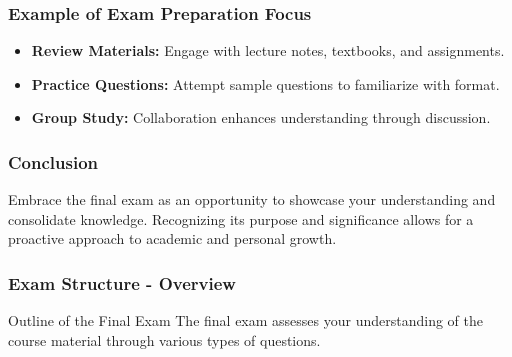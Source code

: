 \documentclass{beamer}
\begin{document}
\begin{frame}[fragile]
    \frametitle{Example of Exam Preparation Focus}
    \begin{itemize}
        \item \textbf{Review Materials:} Engage with lecture notes, textbooks, and assignments.
        \item \textbf{Practice Questions:} Attempt sample questions to familiarize with format.
        \item \textbf{Group Study:} Collaboration enhances understanding through discussion.
    \end{itemize}
\end{frame}

\begin{frame}[fragile]
    \frametitle{Conclusion}
    Embrace the final exam as an opportunity to showcase your understanding and consolidate knowledge. Recognizing its purpose and significance allows for a proactive approach to academic and personal growth.
\end{frame}

\begin{frame}[fragile]
    \frametitle{Exam Structure - Overview}
    \begin{block}{Outline of the Final Exam}
        The final exam assesses your understanding of the course material through various types of questions.
    \end{block}
\end{frame}
\end{document}
